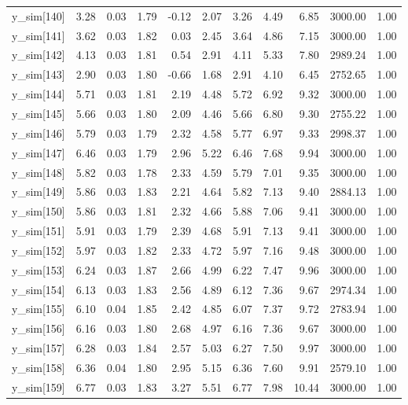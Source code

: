 \begin{table}[ht]
\begin{tabular}{rrrrrrrrrrr}
  y\_sim[140] & 3.28 & 0.03 & 1.79 & -0.12 & 2.07 & 3.26 & 4.49 & 6.85 & 3000.00 & 1.00 \\ 
  y\_sim[141] & 3.62 & 0.03 & 1.82 & 0.03 & 2.45 & 3.64 & 4.86 & 7.15 & 3000.00 & 1.00 \\ 
  y\_sim[142] & 4.13 & 0.03 & 1.81 & 0.54 & 2.91 & 4.11 & 5.33 & 7.80 & 2989.24 & 1.00 \\ 
  y\_sim[143] & 2.90 & 0.03 & 1.80 & -0.66 & 1.68 & 2.91 & 4.10 & 6.45 & 2752.65 & 1.00 \\ 
  y\_sim[144] & 5.71 & 0.03 & 1.81 & 2.19 & 4.48 & 5.72 & 6.92 & 9.32 & 3000.00 & 1.00 \\ 
  y\_sim[145] & 5.66 & 0.03 & 1.80 & 2.09 & 4.46 & 5.66 & 6.80 & 9.30 & 2755.22 & 1.00 \\ 
  y\_sim[146] & 5.79 & 0.03 & 1.79 & 2.32 & 4.58 & 5.77 & 6.97 & 9.33 & 2998.37 & 1.00 \\ 
  y\_sim[147] & 6.46 & 0.03 & 1.79 & 2.96 & 5.22 & 6.46 & 7.68 & 9.94 & 3000.00 & 1.00 \\ 
  y\_sim[148] & 5.82 & 0.03 & 1.78 & 2.33 & 4.59 & 5.79 & 7.01 & 9.35 & 3000.00 & 1.00 \\ 
  y\_sim[149] & 5.86 & 0.03 & 1.83 & 2.21 & 4.64 & 5.82 & 7.13 & 9.40 & 2884.13 & 1.00 \\ 
  y\_sim[150] & 5.86 & 0.03 & 1.81 & 2.32 & 4.66 & 5.88 & 7.06 & 9.41 & 3000.00 & 1.00 \\ 
  y\_sim[151] & 5.91 & 0.03 & 1.79 & 2.39 & 4.68 & 5.91 & 7.13 & 9.41 & 3000.00 & 1.00 \\ 
  y\_sim[152] & 5.97 & 0.03 & 1.82 & 2.33 & 4.72 & 5.97 & 7.16 & 9.48 & 3000.00 & 1.00 \\ 
  y\_sim[153] & 6.24 & 0.03 & 1.87 & 2.66 & 4.99 & 6.22 & 7.47 & 9.96 & 3000.00 & 1.00 \\ 
  y\_sim[154] & 6.13 & 0.03 & 1.83 & 2.56 & 4.89 & 6.12 & 7.36 & 9.67 & 2974.34 & 1.00 \\ 
  y\_sim[155] & 6.10 & 0.04 & 1.85 & 2.42 & 4.85 & 6.07 & 7.37 & 9.72 & 2783.94 & 1.00 \\ 
  y\_sim[156] & 6.16 & 0.03 & 1.80 & 2.68 & 4.97 & 6.16 & 7.36 & 9.67 & 3000.00 & 1.00 \\ 
  y\_sim[157] & 6.28 & 0.03 & 1.84 & 2.57 & 5.03 & 6.27 & 7.50 & 9.97 & 3000.00 & 1.00 \\ 
  y\_sim[158] & 6.36 & 0.04 & 1.80 & 2.95 & 5.15 & 6.36 & 7.60 & 9.91 & 2579.10 & 1.00 \\ 
  y\_sim[159] & 6.77 & 0.03 & 1.83 & 3.27 & 5.51 & 6.77 & 7.98 & 10.44 & 3000.00 & 1.00 \\ 

\end{tabular}
\end{table}
